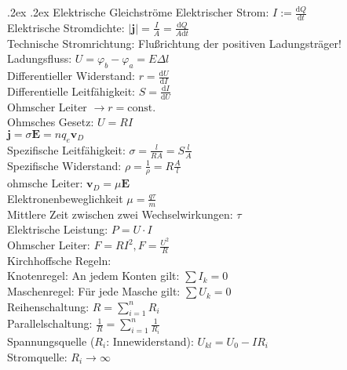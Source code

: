\documentclass[10pt, landscape,a4paper]{extarticle}
\makeatletter
\renewcommand{\section}{\@startsection{section}{1}{0mm}%
                                {.2ex}%
                                {.2ex}%
                                {\sffamily\small\bfseries}}
\renewcommand\v[1]{\vec{#1}}
\renewcommand\d{\mathrm{d}}
\renewcommand{\vec}[1]{\mathbf{#1}}
\newcommand*\abs[1]{\lvert#1\rvert}
\newcommand{\dd}[2]{\frac{\d #1}{\d #2}}
\newcommand{\const}{\ensuremath{\text{const.}}}%
\makeatother
\begin{document}
\begin{multicols*}{4}
\section{Elektrische Gleichströme}
Elektrischer Strom: $I := \dd{Q}{t}$ \\
Elektrische Stromdichte: $\abs{\v j} = \frac{I}{A} = \frac{\d Q}{A \d t}$ \\
Technische Stromrichtung: Flußrichtung der positiven Ladungsträger! \\
Ladungsfluss: $U = φ_b - φ_a = E Δl$ \\
Differentieller Widerstand: $r = \dd{U}{I}$ \\
Differentielle Leitfähigkeit: $S = \dd{I}{U}$ \\
Ohmscher Leiter $\to r = \const$ \\
Ohmsches Gesetz: $U = R I$ \\
$\v j = σ \v E = n q_e \v v_D$ \\
Spezifische Leitfähigkeit: $σ = \frac{l}{RA} = S \frac{l}{A}$ \\
Spezifische Widerstand: $ρ = \frac{1}{ρ} = R \frac{A}{l}$ \\
ohmsche Leiter: $\v v_D = μ \v E$ \\
Elektronenbeweglichkeit $μ = \frac{q τ}{m}$ \\
Mittlere Zeit zwischen zwei Wechselwirkungen: $τ$ \\
Elektrische Leistung: $P = U · I$ \\
Ohmscher Leiter: $F = R I^2, F = \frac{U^2}{R}$ \\
Kirchhoffsche Regeln: \\
Knotenregel: An jedem Konten gilt: $\sum I_k = 0$ \\
Maschenregel: Für jede Masche gilt: $\sum U_k = 0$ \\
Reihenschaltung: $R = \sum_{i = 1}^n R_i$ \\
Parallelschaltung: $\frac{1}{R} = \sum_{i = 1}^n \frac{1}{R_i}$ \\
Spannungsquelle ($R_i$: Innewiderstand): $U_{kl} = U_0 - I R_i$ \\
Stromquelle: $R_i \to ∞$

\end{multicols*}
\end{document}
